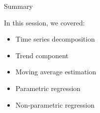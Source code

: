 \documentclass[aspectratio=169]{beamer}
\begin{document}
\begin{frame}{Summary}

In this session, we covered:

\begin{itemize}

\item Time series decomposition

\item Trend component

\item Moving average estimation

\item Parametric regression

\item Non-parametric regression

\end{itemize}

\end{frame}
\end{document}
